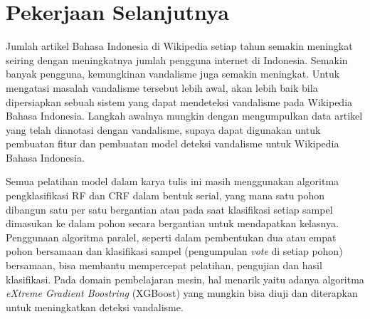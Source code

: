 \section{Pekerjaan Selanjutnya}

Jumlah artikel Bahasa Indonesia di Wikipedia setiap tahun semakin meningkat
seiring dengan meningkatnya jumlah pengguna internet di Indonesia.
Semakin banyak pengguna, kemungkinan vandalisme juga semakin meningkat.
Untuk mengatasi masalah vandalisme tersebut lebih awal, akan lebih baik bila
dipersiapkan sebuah sistem yang dapat mendeteksi vandalisme pada Wikipedia
Bahasa Indonesia.
Langkah awalnya mungkin dengan mengumpulkan data artikel yang telah dianotasi
dengan vandalisme, supaya dapat digunakan untuk pembuatan fitur dan pembuatan
model deteksi vandalisme untuk Wikipedia Bahasa Indonesia.

Semua pelatihan model dalam karya tulis ini masih menggunakan algoritma
pengklasifikasi RF dan CRF dalam bentuk serial, yang mana satu pohon dibangun
satu per satu bergantian atau pada saat klasifikasi setiap sampel dimasukan ke
dalam pohon secara bergantian untuk mendapatkan kelasnya.
Penggunaan algoritma paralel, seperti dalam pembentukan dua atau empat pohon
bersamaan dan klasifikasi sampel (pengumpulan \textit{vote} di setiap pohon)
bersamaan, bisa membantu mempercepat pelatihan, pengujian dan hasil
klasifikasi.
Pada domain pembelajaran mesin, hal menarik yaitu adanya algoritma
\textit{eXtreme Gradient Boostring} (XGBoost) \cite{chen2016xgboost} yang
mungkin bisa diuji dan diterapkan untuk meningkatkan deteksi vandalisme.
